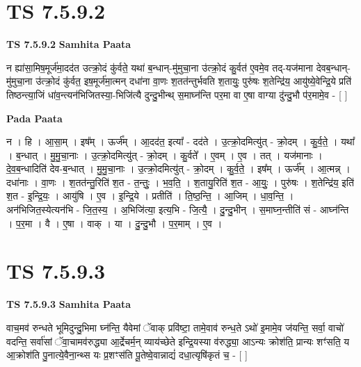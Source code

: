 \documentclass[17pt]{extarticle}
\begin{document}

\section{ TS 7.5.9.2 }

\textbf{TS 7.5.9.2 } \newline
\textbf{Samhita Paata} \newline

न ह्या॑सा॒मिष॒मूर्ज॑मा॒दद॑त उत्क्रो॒दं कु॑र्वते॒ यथा॑ ब॒न्धान्-मु॑मुचा॒ना उ॑त्क्रो॒दं कु॒र्वत॑ ए॒वमे॒व तद्-यज॑माना देवब॒न्धान्-मु॑मुचा॒ना उ॑त्क्रो॒दं कु॑र्वत॒ इष॒मूर्ज॑मा॒त्मन् दधा॑ना वा॒णः श॒तत॑न्तुर्भवति श॒तायुः॒ पुरु॑षः श॒तेन्द्रि॑य॒ आयु॑ष्ये॒वेन्द्रि॒ये प्रति॑ तिष्ठन्त्या॒जिं धा॑व॒न्त्यन॑भिजितस्या॒-भिजि॑त्यै दुन्दु॒भीन्थ् स॒माघ्न॑न्ति पर॒मा वा ए॒षा वाग्या दु॑न्दु॒भौ प॑र॒मामे॒व - [  ] \newline

\textbf{Pada Paata} \newline

न । हि । आ॒सा॒म् । इष᳚म् । ऊर्ज᳚म् । आ॒दद॑त॒ इत्या᳚ - दद॑ते । उ॒त्क्रो॒दमित्यु॑त् - क्रो॒दम् । कु॒र्व॒ते॒ । यथा᳚ । ब॒न्धात् । मु॒मु॒चा॒नाः । उ॒त्क्रो॒दमित्यु॑त् - क्रो॒दम् । कु॒र्वते᳚ । ए॒वम् । ए॒व । तत् । यज॑मानाः । दे॒व॒ब॒न्धादिति॑ देव-ब॒न्धात् । मु॒मु॒चा॒नाः । उ॒त्क्रो॒दमित्यु॑त् - क्रो॒दम् । कु॒र्व॒ते॒ । इष᳚म् । ऊर्ज᳚म् । आ॒त्मन्न् । दधा॑नाः । वा॒णः । श॒तत॑न्तु॒रिति॑ श॒त - त॒न्तुः॒ । भ॒व॒ति॒ । श॒तायु॒रिति॑ श॒त - आ॒युः॒ । पुरु॑षः । श॒तेन्द्रि॑य॒ इति॑ श॒त - इ॒न्द्रि॒यः॒ । आयु॑षि । ए॒व । इ॒न्द्रि॒ये । प्रतीति॑ । ति॒ष्ठ॒न्ति॒ । आ॒जिम् । धा॒व॒न्ति॒ । अन॑भिजित॒स्येत्यन॑भि - जि॒त॒स्य॒ । अ॒भिजि॑त्या॒ इत्य॒भि - जि॒त्यै॒ । दु॒न्दु॒भीन् । स॒माघ्न॒न्तीति॑ सं - आघ्न॑न्ति । प॒र॒मा । वै । ए॒षा । वाक् । या । दु॒न्दु॒भौ । प॒र॒माम् । ए॒व ।  \newline





\section{ TS 7.5.9.3 }

\textbf{TS 7.5.9.3 } \newline
\textbf{Samhita Paata} \newline

वाच॒मव॑ रुन्धते भूमिदुन्दु॒भिमा घ्न॑न्ति॒ यैवेमां ॅवाक् प्रवि॑ष्टा॒ तामे॒वाव॑ रुन्ध॒ते ऽथो॑ इ॒मामे॒व ज॑यन्ति॒ सर्वा॒ वाचो॑ वदन्ति॒ सर्वा॑सां ॅवा॒चामव॑रुद्ध्या आ॒र्द्रेचर्म॒न् व्याय॑च्छेते इन्द्रि॒यस्या व॑रुद्ध्या॒ आऽन्यः क्रोश॑ति॒ प्रान्यः शꣳ॑सति॒ य आ॒क्रोश॑ति पु॒नात्ये॒वैना॒न्थ्स यः प्र॒शꣳस॑ति पू॒तेष्वे॒वान्नाद्यं॑ दधा॒त्यृषि॑कृतं च॒ - [  ] \newline
\end{document}
